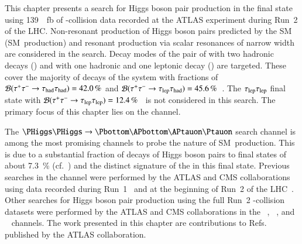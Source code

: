 This chapter presents a search for Higgs boson pair production in the \bbtautau
final state using \SI{139}{\per\femto\barn} of \pp-collision data recorded at
the ATLAS experiment during Run~2 of the LHC. Non-resonant production of Higgs
boson pairs predicted by the SM (SM~\HH production) and resonant production via
scalar resonances of narrow width are considered in the search. Decay modes of
the pair of \tauleptons with two hadronic \taulepton decays (\hadhad) and with
one hadronic and one leptonic \taulepton decay (\lephad) are targeted. These
cover the majority of decays of the \tautau system with fractions of
$\mathcal{B}(\tau^{+} \tau^{-} \to \tau_{\text{had}}\tau_{\text{had}}) = \SI{42.0}{\percent}$ and
$\mathcal{B}(\tau^{+} \tau^{-} \to \tau_{\text{lep}}\tau_{\text{had}}) =
\SI{45.6}{\percent}$~\cite{Zyla:2020zbs}. The $\tau_{\text{lep}}\tau_{\text{lep}}$ final state with
$\mathcal{B}(\tau^{+} \tau^{-} \to \tau_{\text{lep}}\tau_{\text{lep}}) =
\SI{12.4}{\percent}$~\cite{Zyla:2020zbs} is not considered in this search. The
primary focus of this chapter lies on the \hadhad channel.

The $\HH \to \bbtautau$ search channel is among the most promising channels to
probe the nature of SM~\HH production. This is due to a substantial fraction of
decays of Higgs boson pairs to \bbtautau final states of about
\SI{7.3}{\percent} (cf.~) and the distinct
signature of the \tauleptons in this final state. Previous searches in the
\bbtautau channel were performed by the ATLAS and CMS collaborations using data
recorded during Run~1~\cite{HIGG-2013-33,CMS-HIG-15-013} and at the beginning of
Run~2 of the LHC~\cite{HIGG-2016-16-witherratum,CMS-HIG-17-002}.  Other searches
for Higgs boson pair production using the full Run~2 \pp-collision datasets were
performed by the ATLAS and CMS collaborations in the
\bbtautau~\cite{CMS-PAS-HIG-20-010},
\bbbb~\cite{ATLAS-CONF-2022-035,CMS-HIG-20-005}, and
\bbyy~\cite{HDBS-2018-34,CMS-HIG-19-018} channels.
The work presented in this chapter are contributions to
Refs.~\cite{ATLAS-CONF-2021-030,HDBS-2018-40} published by the ATLAS
collaboration.

